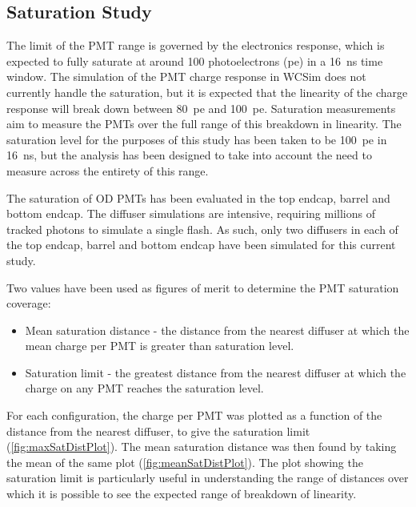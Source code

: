 \documentclass[a4paper,11pt]{article}
\begin{document}
\subsection{Saturation Study}\label{subsec:satStudy}

The limit of the PMT range is governed by the electronics response, which is expected to fully saturate at around 100 photoelectrons (pe) in a 16~ns time window. The simulation of the PMT charge response in WCSim does not currently handle the saturation, but it is expected that the linearity of the charge response will break down between 80~pe and 100~pe. Saturation measurements aim to measure the PMTs over the full range of this breakdown in linearity. The saturation level for the purposes of this study has been taken to be 100~pe in 16~ns, but the analysis has been designed to take into account the need to measure across the entirety of this range.

The saturation of OD PMTs has been evaluated in the top endcap, barrel and bottom endcap. The diffuser simulations are intensive, requiring millions of tracked photons to simulate a single flash. As such, only two diffusers in each of the top endcap, barrel and bottom endcap have been simulated for this current study.

Two values have been used as figures of merit to determine the PMT saturation coverage:
\begin{itemize}
    \item Mean saturation distance - the distance from the nearest diffuser at which the mean charge per PMT is greater than saturation level.
    \item Saturation limit - the greatest distance from the nearest diffuser at which the charge on any PMT reaches the saturation level.
\end{itemize}

For each configuration, the charge per PMT was plotted as a function of the distance from the nearest diffuser, to give the saturation limit (\cref{fig:maxSatDistPlot}). The mean saturation distance was then found by taking the mean of the same plot (\cref{fig:meanSatDistPlot}). The plot showing the saturation limit is particularly useful in understanding the range of distances over which it is possible to see the expected range of breakdown of linearity.
\end{document}
